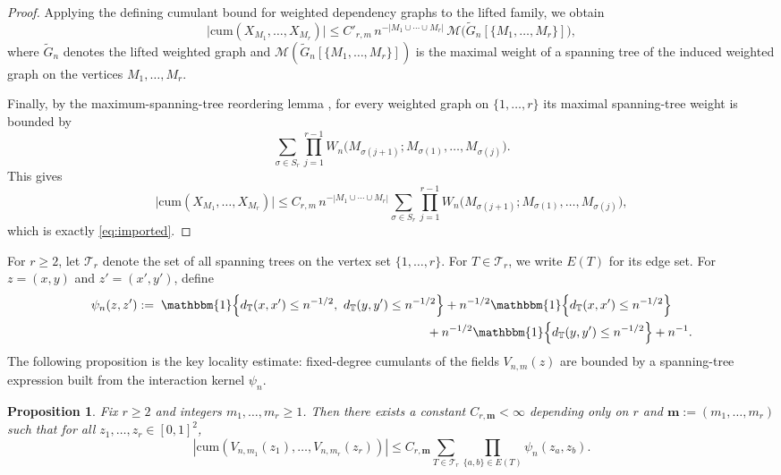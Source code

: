 \documentclass[11pt]{article}
\newtheorem{prop}[thm]{Proposition}
\newcommand{\bone}{\mathbbm{1}}
\begin{document}
\begin{proof}
Applying the defining cumulant bound for weighted dependency graphs to the lifted family, we obtain
\[
\bigl|\mathrm{cum}(X_{M_1},\dots,X_{M_r})\bigr|
\le C'_{r,m}\,
n^{-|M_1\cup\cdots\cup M_r|}
\,\mathcal{M}\bigl(\widetilde G_n[\{M_1,\dots,M_r\}]\bigr),
\]
where $\widetilde G_n$ denotes the lifted weighted graph and
$\mathcal{M}(\widetilde G_n[\{M_1,\dots,M_r\}])$ is the maximal weight of a spanning tree of the
induced weighted graph on the vertices $M_1,\dots,M_r$.

Finally, by the maximum-spanning-tree reordering lemma
\citep[Definition~4.5 and Lemma~3.3]{Feray2018WeightedDG}, for every weighted graph on
$\{1,\dots,r\}$ its maximal spanning-tree weight is bounded by
\[
\sum_{\sigma\in S_r}\prod_{j=1}^{r-1}
W_n\!\bigl(M_{\sigma(j+1)};M_{\sigma(1)},\dots,M_{\sigma(j)}\bigr).
\]
This gives
\[
\bigl|\mathrm{cum}(X_{M_1},\dots,X_{M_r})\bigr|
\le
C_{r,m}\,
n^{-|M_1\cup\cdots\cup M_r|}
\sum_{\sigma\in S_r}
\prod_{j=1}^{r-1}
W_n\!\bigl(M_{\sigma(j+1)};M_{\sigma(1)},\dots,M_{\sigma(j)}\bigr),
\]
which is exactly \eqref{eq:imported}.
\end{proof}

For $r\ge2$, let $\mathcal T_r$ denote the set of all spanning trees on the vertex set $\{1,\dots,r\}$. For $T\in\mathcal T_r$, we write $E(T)$ for its edge set. For $z=(x,y)$ and $z'=(x',y')$, define
\begin{equation}\label{eq:psi}
\begin{aligned}
\psi_n(z,z')
:=\; \bone\Bigl\{d_{\mathbb{T}}(x, x') \le n^{-1/2},\ d_{\mathbb{T}}(y, y') \le n^{-1/2}\Bigr\} &+ n^{-1/2}\bone\Bigl\{d_{\mathbb{T}}(x, x') \le n^{-1/2}\Bigr\} \\
&\hspace{-0.5cm}+ n^{-1/2}\bone\Bigl\{d_{\mathbb{T}}(y, y') \le n^{-1/2}\Bigr\}+ n^{-1}.
\end{aligned}
\end{equation}
The following proposition is the key locality estimate: fixed-degree cumulants of the fields $V_{n, m}(z)$ are bounded by a spanning-tree expression built from the interaction kernel $\psi_n$.
\begin{prop}
\label{prop:Vm-fixed-degrees}
Fix $r \ge 2$ and integers $m_1,\dots,m_r \ge 1$. Then there exists a constant
$C_{r, \mathbf{m}}<\infty$ depending only on $r$ and $\mathbf{m} := (m_1,\ldots, m_r)$ such that for all $z_1,\dots,z_r\in[0,1]^2$,
\begin{equation}\label{eq:8}
\left|
\mathrm{cum}\!\left(V_{n,m_1}(z_1),\dots,V_{n,m_r}(z_r)\right)
\right|
\le
C_{r, \mathbf{m}}
\sum_{T\in\mathcal T_r}
\prod_{\{a,b\}\in E(T)} \psi_n(z_a,z_b).
\end{equation}
\end{prop}
\end{document}
